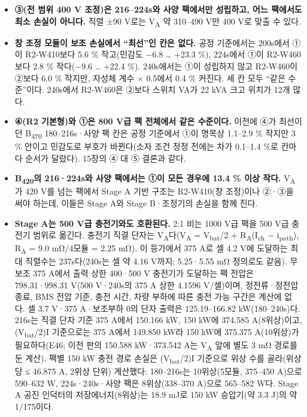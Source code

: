 \begin{itemize}
\item \textbf{③(전 범위 400 V 조정)은 216–224s와 사양 팩에서만 성립하고, 어느 팩에서도 최소 손실이 아니다.} 직렬 ±90 V로는 V\textsubscript{A} 약 310–490 V만 400 V로 맞출 수 있다.
\item \textbf{창 조정 모듈이 보조 손실에서 “최선”인 칸은 없다.} 공정 기준에서는 200s에서 ①이 R2-W410보다 5.6 \% 작고(민감도 −6.8 … +23.3 \%), 224s에서 ①이 R2-W460보다 2.8 \% 작다(−9.6 … +22.4 \%). 240s에서는 ①이 성립하지 않고 R2-W460이 ②보다 6.0 \% 작지만, 자성체 계수 × 0.5에서 0.4 \% 커진다. 세 칸 모두 “같은 수준”이다. 240s에서 R2-W460은 ②보다 스위치 VA가 22 kVA 크고 위치가 12개 많다.
\item \textbf{④(R2 기본형)와 ①은 800 V급 팩 전체에서 같은 수준이다.} 이전에 ④가 최선이던 B\textsubscript{470} 180–216s·사양 팩 칸은 공정 기준에서 ①이 명목상 1.1–2.9 \% 작지만 3 \% 안이고 민감도로 부호가 바뀐다(소자 조건 정정 전에는 차가 0.1–1.4 \%로 칸마다 순서가 달랐다). 15장의 ④ 대 ⑤ 결론과 같다.
\item \textbf{B\textsubscript{420}의 216·224s와 사양 팩에서는 ①이 모든 경우에 13.4 \% 이상 작다.} V\textsubscript{A}가 420 V를 넘는 팩에서 Stage A 기반 구조는 R2-W410(창 조정)이나 ②·③을 써야 하는데, 이들은 Stage A와 Stage B·조정기의 손실을 함께 진다.
\item \textbf{Stage A는 500 V급 충전기와도 호환된다.} 2:1 비는 1000 V급 팩을 500 V급 충전기 범위로 옮긴다. 충전기 직결 단자는 V\textsubscript{A}다(V\textsubscript{A} = V\textsubscript{bat}/2 + R\textsubscript{A}(I\textsubscript{ch} − i\textsubscript{path}), R\textsubscript{A} = 9.0 mΩ/4모듈 = 2.25 mΩ). 이 등가에서 375 A로 셀 4.2 V에 도달하는 최대 직렬수는 237s다(240s는 셀 약 4.16 V까지; 5.25·5.55 mΩ 정의로도 같음). 무보조 375 A에서 출력 상한 400·500 V 충전기가 도달하는 팩 전압은 798.31·998.31 V(500 V·240s의 375 A 상한 4.1596 V/셀)이며, 정전류·정전압 종료, BMS 전압 기준, 충전 시간, 차량 부하에 따른 충전 가능 구간은 계산에 없다. 셀 3.7 V·375 A·보조부하 0의 단자 출력은 125.19–166.82 kW(180–240s)다. 216s는 직결 단자 기준 375 A에서 150.166 kW, 150 kW에 374.585 A(8위상)이고, (V\textsubscript{bat}/2)I 기준으로는 375 A에서 149.850 kW라 150 kW에 375.375 A(10위상)가 필요하다(E46; 이전 판의 150.588 kW·373.542 A는 V\textsubscript{A} 앞에 별도 3 mΩ 경로를 둔 계산). 팩별 150 kW 충전 경로 손실은 (V\textsubscript{bat}/2)I 기준으로 위상 수를 골라(위상당 ≤ 46.875 A, 2위상 단위) 계산했다: 180–216s는 10위상(5모듈, 375–450 A)으로 590–632 W, 224s·240s·사양 팩은 8위상(338–370 A)으로 565–582 W다. Stage A 공진 인덕터의 저장에너지(8위상)는 18.9 mJ로 150 kW 승압기(약 3.3 J)의 약 1/175이다.
\end{itemize}

